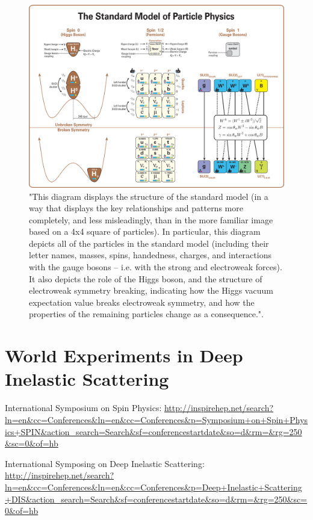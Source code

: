 \begin{figure}[ht]
	\centering
	\includegraphics[width=\linewidth]{./figures/standard_model_complete_lowres.png}
	\caption{
		"This diagram displays the structure of the standard model (in a way that
		displays the key relationships and patterns more completely, and less
		misleadingly, than in the more familiar image based on a 4x4 square of
		particles). In particular, this diagram depicts all of the particles in the
		standard model (including their letter names, masses, spins, handedness,
		charges, and interactions with the gauge bosons -- i.e. with the strong and
		electroweak forces). It also depicts the role of the Higgs boson, and the
		structure of electroweak symmetry breaking, indicating how the Higgs vacuum
		expectation value breaks electroweak symmetry, and how the properties of the
		remaining particles change as a consequence."\cite{Boyle2014}.
	}
	\label{fig:standardmodel}
\end{figure}


\clearpage
\section{World Experiments in Deep Inelastic Scattering}

International Symposium on Spin Physics:
\url{http://inspirehep.net/search?ln=en&cc=Conferences&ln=en&cc=Conferences&p=Symposium+on+Spin+Physics+SPIN&action_search=Search&sf=conferencestartdate&so=d&rm=&rg=250&sc=0&of=hb}

International Symposing on Deep Inelastic Scattering:
\url{http://inspirehep.net/search?ln=en&cc=Conferences&ln=en&cc=Conferences&p=Deep+Inelastic+Scattering+DIS&action_search=Search&sf=conferencestartdate&so=d&rm=&rg=250&sc=0&of=hb}

